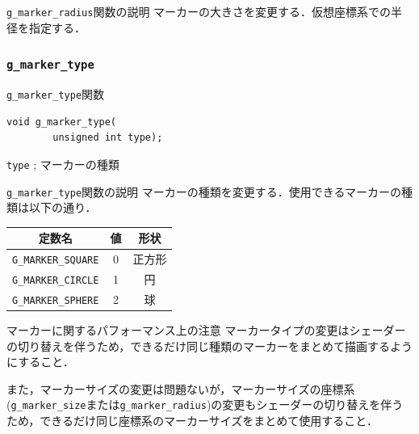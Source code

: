 \documentclass[platex,a4paper,12pt]{jsarticle}%
\begin{document}
\begin{itembox}[l]{\texttt{g\_marker\_radius}関数の説明}
	マーカーの大きさを変更する．仮想座標系での半径を指定する．
\end{itembox}

\clearpage

\subsubsection{\texttt{g\_marker\_type}}

\begin{itembox}[l]{\texttt{g\_marker\_type}関数}
\begin{verbatim}
void g_marker_type(
        unsigned int type);
\end{verbatim}
\verb|type| ; マーカーの種類
\end{itembox}

\begin{itembox}[l]{\texttt{g\_marker\_type}関数の説明}
マーカーの種類を変更する．使用できるマーカーの種類は以下の通り．
\begin{center}
\begin{tabular}{|c|c|c|}
	\hline 
	定数名 & 値 & 形状 \\ 
	\hline 
	\verb|G_MARKER_SQUARE| & 0 & 正方形 \\ 
	\hline 
	\verb|G_MARKER_CIRCLE| & 1 & 円 \\ 
	\hline 
	\verb|G_MARKER_SPHERE| & 2 & 球 \\ 
	\hline 
\end{tabular}
\end{center}
\end{itembox}

\begin{itembox}[l]{マーカーに関するパフォーマンス上の注意}
マーカータイプの変更はシェーダーの切り替えを伴うため，できるだけ同じ種類のマーカーをまとめて描画するようにすること．

また，マーカーサイズの変更は問題ないが，マーカーサイズの座標系(\verb|g_marker_size|または\verb|g_marker_radius|)の変更もシェーダーの切り替えを伴うため，できるだけ同じ座標系のマーカーサイズをまとめて使用すること．
\end{itembox}
\end{document}
